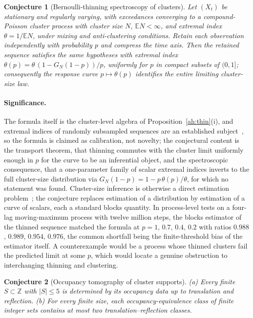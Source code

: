 \documentclass[11pt]{article}
\newtheorem{conjecture}{Conjecture}
\theoremstyle{definition}
\newcommand{\E}{\mathbb E}
\newcommand{\Z}{\mathbb Z}
\providecommand{\Z}{\mathbb Z}
\providecommand{\E}{\mathbb E}
\begin{document}
\begin{conjecture}[Bernoulli-thinning spectroscopy of clusters]\label{ah5}
Let $(X_t)$ be stationary and regularly varying, with exceedances converging to a compound-Poisson cluster process with cluster size $N$, $\E N<\infty$, and extremal index $\theta=1/\E N$, under mixing and anti-clustering conditions.  Retain each observation independently with probability $p$ and compress the time axis.  Then the retained sequence satisfies the same hypotheses with extremal index $\theta(p)=\theta\,(1-G_N(1-p))/p$, uniformly for $p$ in compact subsets of $(0,1]$; consequently the response curve $p\mapsto\theta(p)$ identifies the entire limiting cluster-size law.
\end{conjecture}

\paragraph{Significance.}
The formula itself is the cluster-level algebra of Proposition~\ref{ah:thin}(i), and extremal indices of randomly subsampled sequences are an established subject~\cite{HS08,MF04,RT00}, so the formula is claimed as calibration, not novelty; the conjectural content is the transport theorem, that thinning commutes with the cluster limit uniformly enough in $p$ for the curve to be an inferential object, and the spectroscopic consequence, that a one-parameter family of scalar extremal indices inverts to the full cluster-size distribution via $G_N(1-p)=1-p\,\theta(p)/\theta$, for which no statement was found.  Cluster-size inference is otherwise a direct estimation problem~\cite{Rob09}; the conjecture replaces estimation of a distribution by estimation of a curve of scalars, each a standard blocks quantity.  In process-level tests on a four-lag moving-maximum process with twelve million steps, the blocks estimator of the thinned sequence matched the formula at $p=1,\,0.7,\,0.4,\,0.2$ with ratios $0.988$, $0.989$, $0.954$, $0.976$, the common shortfall being the finite-threshold bias of the estimator itself.  A counterexample would be a process whose thinned clusters fail the predicted limit at some $p$, which would locate a genuine obstruction to interchanging thinning and clustering.

\begin{conjecture}[Occupancy tomography of cluster supports]\label{ah6}
(a) Every finite $S\subset\Z$ with $|S|\le5$ is determined by its occupancy data up to translation and reflection.  (b) For every finite size, each occupancy-equivalence class of finite integer sets contains at most two translation--reflection classes.
\end{conjecture}
\end{document}

